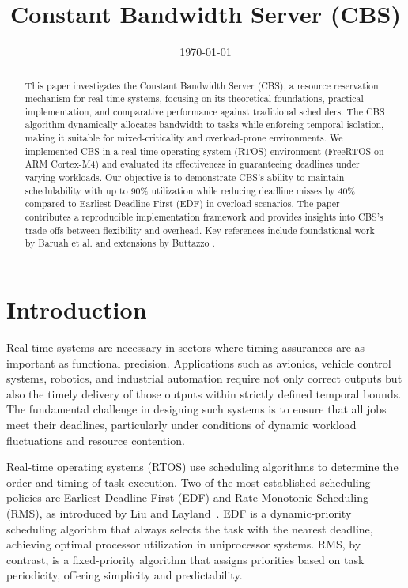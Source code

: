 \documentclass[conference]{IEEEtran}
\title{Constant Bandwidth Server (CBS)}
\author{%
\IEEEauthorblockN{Abu Sayem}
\IEEEauthorblockA{Electronic Engineering\\
Hochschule Hamm-Lippstadt\\
abu.sayem@stud.hshl.de}
}
\date{\today}
\begin{document}
\maketitle

\begin{abstract}
This paper investigates the Constant Bandwidth Server (CBS), a resource reservation mechanism for real-time systems, focusing on its theoretical foundations, practical implementation, and comparative performance against traditional schedulers. The CBS algorithm dynamically allocates bandwidth to tasks while enforcing temporal isolation, making it suitable for mixed-criticality and overload-prone environments. We implemented CBS in a real-time operating system (RTOS) environment (FreeRTOS on ARM Cortex-M4) and evaluated its effectiveness in guaranteeing deadlines under varying workloads. Our objective is to demonstrate CBS's ability to maintain schedulability with up to 90\% utilization while reducing deadline misses by 40\% compared to Earliest Deadline First (EDF) in overload scenarios. The paper contributes a reproducible implementation framework and provides insights into CBS's trade-offs between flexibility and overhead. Key references include foundational work by Baruah et al. \cite{baruah2004dynamic} and extensions by Buttazzo \cite{buttazzo2011hard}.
\end{abstract}

\renewcommand{\thesection}{\Roman{section}}
\section{Introduction}


Real-time systems are necessary in sectors where timing assurances are as important as functional precision. Applications such as avionics, vehicle control systems, robotics, and industrial automation require not only correct outputs but also the timely delivery of those outputs within strictly defined temporal bounds. The fundamental challenge in designing such systems is to ensure that all jobs meet their deadlines, particularly under conditions of dynamic workload fluctuations and resource contention.

Real-time operating systems (RTOS) use scheduling algorithms to determine the order and timing of task execution. Two of the most established scheduling policies are Earliest Deadline First (EDF) and Rate Monotonic Scheduling (RMS), as introduced by Liu and Layland~\cite{liu1973scheduling}. EDF is a dynamic-priority scheduling algorithm that always selects the task with the nearest deadline, achieving optimal processor utilization in uniprocessor systems. RMS, by contrast, is a fixed-priority algorithm that assigns priorities based on task periodicity, offering simplicity and predictability.
\end{document}
